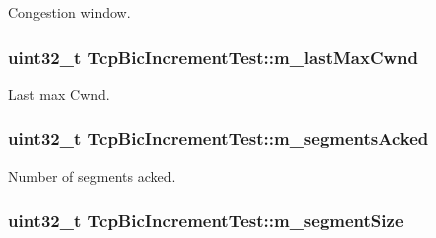 Congestion window. 

\subsubsection[{\texorpdfstring{m\+\_\+last\+Max\+Cwnd}{m_lastMaxCwnd}}]{\setlength{\rightskip}{0pt plus 5cm}uint32\+\_\+t Tcp\+Bic\+Increment\+Test\+::m\+\_\+last\+Max\+Cwnd\hspace{0.3cm}{\ttfamily [private]}}\hypertarget{classTcpBicIncrementTest_abc6cf3f641221e276bd5eb67975b1037}{}\label{classTcpBicIncrementTest_abc6cf3f641221e276bd5eb67975b1037}


Last max Cwnd. 

\subsubsection[{\texorpdfstring{m\+\_\+segments\+Acked}{m_segmentsAcked}}]{\setlength{\rightskip}{0pt plus 5cm}uint32\+\_\+t Tcp\+Bic\+Increment\+Test\+::m\+\_\+segments\+Acked\hspace{0.3cm}{\ttfamily [private]}}\hypertarget{classTcpBicIncrementTest_ad246654ee463b2af9db44089f4d2f1c9}{}\label{classTcpBicIncrementTest_ad246654ee463b2af9db44089f4d2f1c9}


Number of segments acked. 

\subsubsection[{\texorpdfstring{m\+\_\+segment\+Size}{m_segmentSize}}]{\setlength{\rightskip}{0pt plus 5cm}uint32\+\_\+t Tcp\+Bic\+Increment\+Test\+::m\+\_\+segment\+Size\hspace{0.3cm}{\ttfamily [private]}}\hypertarget{classTcpBicIncrementTest_ade93140ecf0019b8c17b6ddbd3361167}{}\label{classTcpBicIncrementTest_ade93140ecf0019b8c17b6ddbd3361167}


